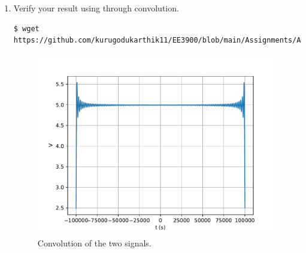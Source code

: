 \documentclass[journal,12pt,twocolumn]{IEEEtran}
\renewcommand\thesection{\arabic{section}}
\begin{document}
\begin{enumerate}[label=\thesection.\arabic*
,ref=\thesection.\theenumi]
\item Verify your result using through convolution. \\
\solution 
\begin{lstlisting}
$ wget https://github.com/kurugodukarthik11/EE3900/blob/main/Assignments/Assignment_6/codes/4.3.py
\end{lstlisting}
\begin{figure}[!ht]
\includegraphics[width=\columnwidth]{figs/4.3.pdf}
\caption{Convolution of the two signals.}
\label{eq:fig-conv}
\end{figure}
\end{enumerate}
\end{document}
